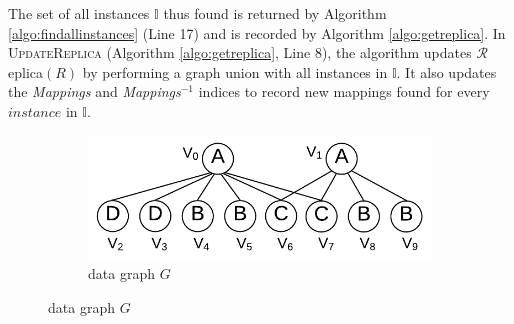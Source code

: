 The set of all instances $\mathbb{I}$ thus found is returned by Algorithm \ref{algo:findallinstances} (Line 17) and is recorded by
Algorithm \ref{algo:getreplica}. In \textsc{UpdateReplica} (Algorithm \ref{algo:getreplica}, Line 8), the algorithm
updates $\mathcal{R}$eplica$(R)$ by performing a graph union with all instances in $\mathbb{I}$. It also updates the
\textit{Mappings} and \textit{Mappings$^{-1}$} indices to record new mappings found for every $instance$ in $\mathbb{I}$.
%
%
%
%
\begin{figure}[t]
	\captionsetup{textfont=bf,font=small}
	\captionsetup[subfigure]{font=small, skip=-1pt}
	\begin{subfigure}[b]{0.5\textwidth}
		\centering
		\includegraphics[scale=0.5]{img_ex/G.pdf}\hspace*{2.5em}
		\caption{data graph $G$}
		\label{fig:exactG}
	\end{subfigure}%


\end{figure}
